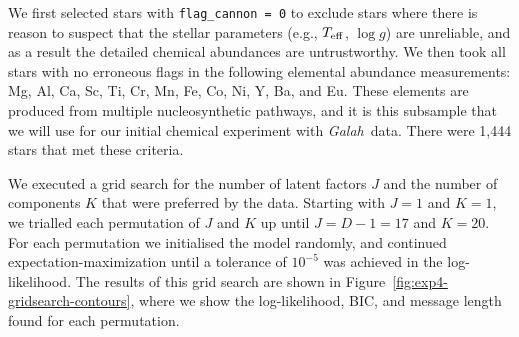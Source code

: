 \documentclass[twocolumn]{aastex62}
\newcommand\teff{T_{\rm eff}}
\newcommand\logg{\log{g}}
\newcommand{\project}[1]{\textsl{#1}}
\newcommand{\Galah}{\project{Galah}}
\newcommand{\todo}[1]{\textcolor{red}{#1}}
\newcommand{\NumDimensions}{D}
\newcommand{\NumLatentFactors}{J}
\newcommand{\NumComponents}{K}
\begin{document}
We first selected stars with \texttt{flag\_cannon = 0} to exclude
stars where there is reason to suspect that the stellar parameters
(e.g., $\teff$, $\logg$) are unreliable, and as a result the 
detailed chemical abundances are untrustworthy. We then took all
stars with no erroneous flags in the following elemental abundance
measurements: Mg, Al, Ca, Sc, Ti, Cr, Mn, Fe, Co, Ni, Y, Ba, and Eu.
These elements are produced from multiple nucleosynthetic
pathways, and it is this subsample that we will use for 
our initial chemical experiment with \Galah\ data.
There were 1,444 stars that met these criteria. 

We executed a grid search for the number of latent factors $\NumLatentFactors$
and the number of components $\NumComponents$ that were preferred by the data.
Starting with $\NumLatentFactors = 1$ and $\NumComponents = 1$, we trialled each
permutation of $\NumLatentFactors$ and $\NumComponents$ up until $\NumLatentFactors = \NumDimensions - 1 = 17$
and $\NumComponents = 20$. For each permutation we initialised the model randomly,
and continued expectation-maximization until a tolerance of $10^{-5}$ was achieved
in the log-likelihood. The results of this grid search are shown in Figure~\ref{fig:exp4-gridsearch-contours},
where we show the log-likelihood, BIC, and message length found for each permutation.
\end{document}
